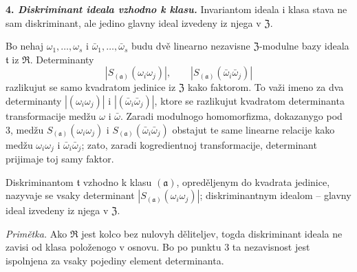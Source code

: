 \documentclass[11pt]{article}
\begin{document}
\setcounter{footnote}{26}

\textbf{4. \emph{Diskriminant ideala vzhodno k klasu.}} Invariantom ideala i klasa stava ne sam diskriminant, ale jedino glavny ideal izvedeny iz njega v $\mathfrak Z$.

Bo nehaj $\omega_1,\ldots,\omega_s$ i $\bar\omega_1,\ldots,\bar\omega_s$ budu dvě linearno nezavisne $\mathfrak Z$-modulne bazy ideala $\mathfrak t$ iz $\mathfrak R$. Determinanty
\[
        |S_{(\mathfrak a)}(\omega_i\omega_j)|,
        \qquad
        |S_{(\mathfrak a)}(\bar\omega_i\bar\omega_j)|
\]
razlikujut se samo kvadratom jedinice iz $\mathfrak Z$ kako faktorom. To važi imeno za dva determinanty $|(\omega_i\omega_j)|$ i $|(\bar\omega_i\bar\omega_j)|$, ktore se razlikujut kvadratom determinanta transformacije medžu $\omega$ i $\bar\omega$. Zaradi modulnogo homomorfizma, dokazanygo pod 3, medžu $S_{(\mathfrak a)}(\omega_i\omega_j)$ i $S_{(\mathfrak a)}(\bar\omega_i\bar\omega_j)$ obstajut te same linearne relacije kako medžu $\omega_i\omega_j$ i $\bar\omega_i\bar\omega_j$; zato, zaradi kogredientnoj transformacije, determinant prijimaje toj samy faktor.

Diskriminantom $\mathfrak t$ vzhodno k klasu $(\mathfrak a)$, opreděljenym do kvadrata jedinice, nazyvaje se vsaky determinant $|S_{(\mathfrak a)}(\omega_i\omega_j)|$; diskriminantnym idealom -- glavny ideal izvedeny iz njega v $\mathfrak Z$.

\emph{Primětka.} Ako $\mathfrak R$ jest kolco bez nulovyh děliteljev, togda diskriminant ideala ne zavisi od klasa položenogo v osnovu. Bo po punktu 3 ta nezavisnost jest ispolnjena za vsaky pojediny element determinanta.
\end{document}
